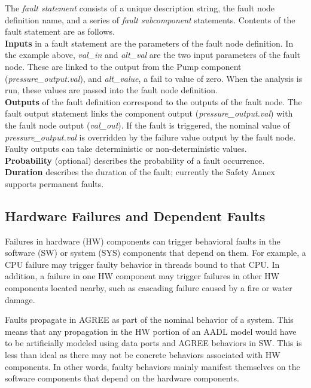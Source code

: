 The \textit{fault statement} consists of a unique description string, the fault node definition name, and a series of \textit{fault subcomponent} statements. Contents of the fault statement are as follows.\\
\textbf{Inputs} in a fault statement are the parameters of the fault node definition. In the example above, \textit{val\_in} and \textit{alt\_val} are the two input parameters of the fault node. These are linked to the output from the Pump component (\textit{pressure\_output.val}), and \textit{alt\_value}, a fail to value of zero. When the analysis is run, these values are passed into the fault node definition.\\
\textbf{Outputs} of the fault definition correspond to the outputs of the fault node. The fault output statement links the component output (\textit{pressure\_output.val}) with the fault node output (\textit{val\_out}). If the fault is triggered, the nominal value of \textit{pressure\_output.val} is overridden by the failure value output by the fault node. Faulty outputs can take deterministic or non-deterministic values. \\
\textbf{Probability} (optional) describes the probability of a fault occurrence.\\
\textbf{Duration} describes the duration of the fault; currently the Safety Annex supports permanent faults.\\

\subsection{Hardware Failures and Dependent Faults}

Failures in hardware (HW) components can trigger behavioral faults in the software (SW) or system (SYS) components that depend on them.  For example, a CPU failure may trigger faulty behavior in threads bound to that CPU. In addition, a failure in one HW component may trigger failures in other HW components located nearby, such as cascading failure caused by a fire or water damage.

Faults propagate in AGREE as part of the nominal behavior of a system. This means that any propagation in the HW portion of an AADL model would have to be artificially modeled using data ports and AGREE behaviors in SW. This is less than ideal as there may not be concrete behaviors associated with HW components. In other words, faulty behaviors mainly manifest themselves on the software components that depend on the hardware components.

